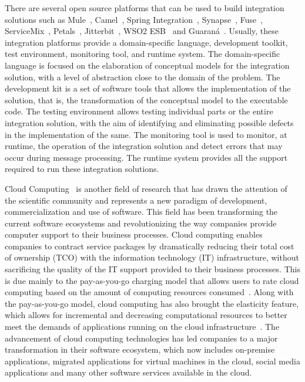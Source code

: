 There are several open source platforms that can be used to build integration solutions such as Mule~\cite{dossot2014}, Camel~\cite{isen2010}, Spring Integration~\cite{fisher2012}, Synapse~\cite{rademakers2008,jayasinghe2011}, Fuse~\cite{russell2012}, ServiceMix~\cite{konsek2013}, Petals~\cite{surhone2010}, Jitterbit~\cite{russell2012_1}, WSO2 ESB~\cite{indrasiri2016} and Guaraná~\cite{frantz2012}. Usually, these integration platforms provide a domain-specific language, development toolkit, test environment, monitoring tool, and runtime system. The domain-specific language is focused on the elaboration of conceptual models for the integration solution, with a level of abstraction close to the domain of the problem. The development kit is a set of software tools that allows the implementation of the solution, that is, the transformation of the conceptual model to the executable code. The testing environment allows testing individual parts or the entire integration solution, with the aim of identifying and eliminating possible defects in the implementation of the same. The monitoring tool is used to monitor, at runtime, the operation of the integration solution and detect errors that may occur during message processing. The runtime system provides all the support required to run these integration solutions.

Cloud Computing~\cite{NIST:2011} is another field of research that has drawn the attention of the scientific community and represents a new paradigm of development, commercialization and use of software. This field has been transforming the current software ecosystems and revolutionizing the way companies provide computer support to their business processes. Cloud computing enables companies to contract service packages by dramatically reducing their total cost of ownership (TCO) with the information technology (IT) infrastructure, without sacrificing the quality of the IT support provided to their business processes. This is due mainly to the pay-as-you-go charging model that allows users to rate cloud computing based on the amount of computing resources consumed~\cite{buyya:2009,SOUSA:2009}. Along with the pay-as-you-go model, cloud computing has also brought the elasticity feature, which allows for incremental and decreasing computational resources to better meet the demands of applications running on the cloud infrastructure~\cite{DIAS:2015}.
The advancement of cloud computing technologies has led companies to a major transformation in their software ecosystem, which now includes on-premise applications, migrated applications for virtual machines in the cloud, social media applications and many other software services available in the cloud. 

